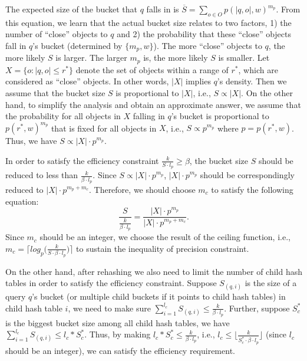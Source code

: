 \begin{IEEEproof}
The expected size of the bucket that $q$ falls in is $\overline S=\sum_{o\in O}p(|q,o|,w)^{m_p}$. From this equation, we learn that the actual bucket size relates to two factors, 1) the number of ``close'' objects to $q$ and 2) the probability that these ``close'' objects fall in $q$'s bucket (determined by $\{m_p,w\}$). The more ``close'' objects to $q$, the more likely $S$ is larger. The larger $m_p$ is, the more likely $S$ is smaller. Let $X=\{o:|q,o|\leq r^*\}$ denote the set of objects within a range of $r^*$, which are considered as ``close'' objects. In other words, $|X|$ implies $q$'s density. Then we assume that the bucket size $S$ is proportional to $|X|$, i.e., $S\propto |X|$. On the other hand, to simplify the analysis and obtain an approximate answer, we assume that the probability for all objects in $X$ falling in $q$'s bucket is proportional to $p(r^*,w)^{m_p}$ that is fixed for all objects in $X$, i.e., $S\propto p^{m_p}$ where $p=p(r^*,w)$. Thus, we have $S\propto|X|\cdot p^{m_p}$.

In order to satisfy the efficiency constraint $\frac{k}{S\cdot l_p}\geq\beta$, the bucket size $S$ should be reduced to less than $\frac{k}{\beta\cdot l_p}$. Since $S\propto|X|\cdot p^{m_p}$, $|X|\cdot p^{m_p}$ should be correspondingly reduced to $|X|\cdot p^{m_p+m_c}$. Therefore, we should choose $m_c$ to satisfy the following equation:
\begin{equation}\label{eq:forefficiency2}
    \frac{S}{\frac{k}{\beta\cdot l_p}}=\frac{|X|\cdot p^{m_p}}{|X|\cdot p^{m_p+m_c}}.
\end{equation}
Since $m_c$ should be an integer, we choose the result of the ceiling function, i.e., $m_c=\big\lceil log_{p}\big(\frac{k}{S\cdot\beta\cdot l_p}\big)\big\rceil$ to sustain the inequality of precision constraint.

On the other hand, after rehashing we also need to limit the number of child hash tables in order to satisfy the efficiency constraint. Suppose $S_{(q,i)}$ is the size of a query $q$'s bucket (or multiple child buckets if it points to child hash tables) in child hash table $i$, we need to make sure $\sum_{i=1}^{l_c}S_{(q,i)}\leq \frac{k}{\beta\cdot l_p}$. Further, suppose $S_c^*$ is the biggest bucket size among all child hash tables, we have $\sum_{i=1}^{l_c}S_{(q,i)}\leq l_c*S_c^*$. Thus, by making $l_c*S_c^*\leq\frac{k}{\beta\cdot l_p}$, i.e., $l_c\leq\big\lfloor\frac{k}{S_c^*\cdot\beta\cdot l_p}\big\rfloor$ (since $l_c$ should be an integer), we can satisfy the efficiency requirement.
\end{IEEEproof}

